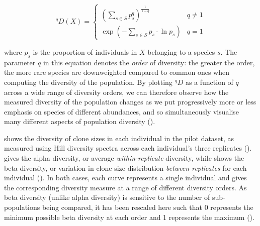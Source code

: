 \begin{equation}
^qD(X) = \begin{cases} \left(\displaystyle\sum_{s \in S} p_s^q \right)^{\frac{1}{1-q}} & q \neq 1\\
\exp\left(-\displaystyle\sum_{s \in S}p_s \cdot \ln p_s\right) & q = 1 \end{cases}
\end{equation}

\noindent where $p_s$ is the proportion of individuals in $X$ belonging to a species $s$. The parameter $q$ in this equation denotes the \textit{order} of diversity: the greater the order, the more rare species are downweighted compared to common ones when computing the diversity of the population. By plotting $^qD$ as a function of $q$ across a wide range of diversity orders, we can therefore observe how the measured diversity of the population changes as we put progressively more or less emphasis on species of different abundances, and so simultaneously visualise many different aspects of population diversity ().

 shows the diversity of clone sizes in each individual in the pilot dataset, as measured using Hill diversity spectra across each individual's three replicates ().  gives the alpha diversity, or average \textit{within-replicate} diversity, while  shows the beta diversity, or variation in clone-size distribution \textit{between replicates} for each individual (). In both cases, each curve represents a single individual and gives the corresponding diversity measure at a range of different diversity orders. As beta diversity (unlike alpha diversity) is sensitive to the number of sub-populations being compared, it has been rescaled here such that 0 represents the minimum possible beta diversity at each order and 1 represents the maximum ().

